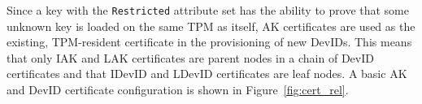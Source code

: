 \documentclass[runningheads]{llncs}
\begin{document}
Since a key with the \verb|Restricted| attribute set has the ability
to prove that some unknown key is loaded on the same TPM as itself, AK
certificates are used as the existing, TPM-resident certificate in the
provisioning of new DevIDs. This means that only IAK and LAK
certificates are parent nodes in a chain of DevID certificates and
that IDevID and LDevID certificates are leaf nodes. A basic AK and
DevID certificate configuration is shown in Figure~\ref{fig:cert_rel}.


\end{document}
